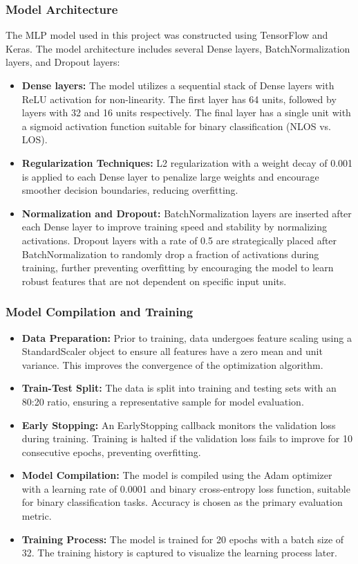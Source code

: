 \subsubsection{Model Architecture}

The MLP model used in this project was constructed using TensorFlow and Keras. The model architecture includes several Dense layers, BatchNormalization layers, and Dropout layers:

\begin{itemize}
    \item \textbf{Dense layers:} The model utilizes a sequential stack of Dense layers with ReLU activation for non-linearity. The first layer has 64 units, followed by layers with 32 and 16 units respectively. The final layer has a single unit with a sigmoid activation function suitable for binary classification (NLOS vs. LOS).
    \item \textbf{Regularization Techniques:} L2 regularization with a weight decay of 0.001 is applied to each Dense layer to penalize large weights and encourage smoother decision boundaries, reducing overfitting.
    \item \textbf{Normalization and Dropout:} BatchNormalization layers are inserted after each Dense layer to improve training speed and stability by normalizing activations. Dropout layers with a rate of 0.5 are strategically placed after BatchNormalization to randomly drop a fraction of activations during training, further preventing overfitting by encouraging the model to learn robust features that are not dependent on specific input units.
\end{itemize}

\subsubsection{Model Compilation and Training}

\begin{itemize}
    \item \textbf{Data Preparation:} Prior to training, data undergoes feature scaling using a StandardScaler object to ensure all features have a zero mean and unit variance. This improves the convergence of the optimization algorithm.
    \item \textbf{Train-Test Split:} The data is split into training and testing sets with an 80:20 ratio, ensuring a representative sample for model evaluation.
    \item \textbf{Early Stopping:} An EarlyStopping callback monitors the validation loss during training. Training is halted if the validation loss fails to improve for 10 consecutive epochs, preventing overfitting.
    \item \textbf{Model Compilation:} The model is compiled using the Adam optimizer with a learning rate of 0.0001 and binary cross-entropy loss function, suitable for binary classification tasks. Accuracy is chosen as the primary evaluation metric.
    \item \textbf{Training Process:} The model is trained for 20 epochs with a batch size of 32. The training history is captured to visualize the learning process later.
\end{itemize}

